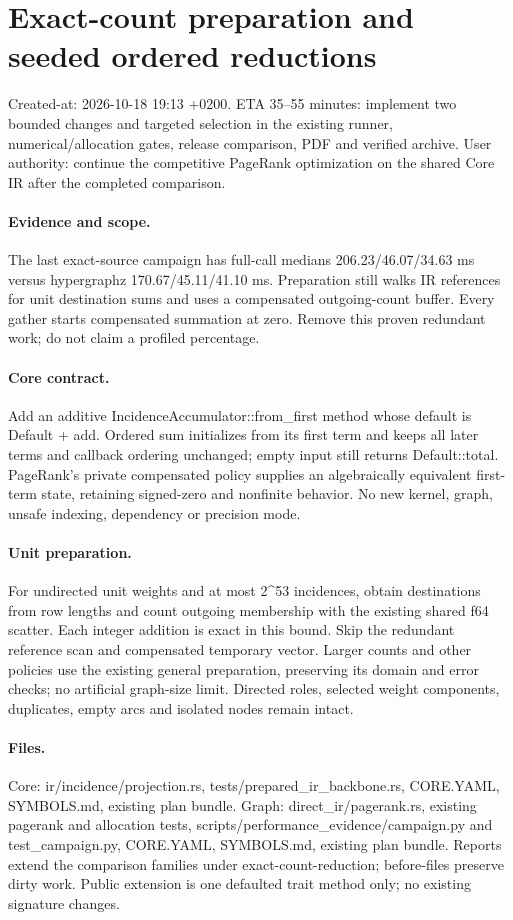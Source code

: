 \documentclass[11pt,a4paper]{article}
\begin{document}
\newpage\section*{Exact-count preparation and seeded ordered reductions}
Created-at: 2026-10-18 19:13 +0200. ETA 35--55 minutes: implement two bounded changes and targeted
selection in the existing runner, numerical/allocation gates, release comparison,
PDF and verified archive. User authority: continue the competitive PageRank
optimization on the shared Core IR after the completed comparison.
\paragraph{Evidence and scope.} The last exact-source campaign has full-call
medians 206.23/46.07/34.63 ms versus hypergraphz 170.67/45.11/41.10 ms.
Preparation still walks IR references for unit destination sums and uses a
compensated outgoing-count buffer. Every gather starts compensated summation at
zero. Remove this proven redundant work; do not claim a profiled percentage.
\paragraph{Core contract.} Add an additive IncidenceAccumulator::from\_first
method whose default is Default + add. Ordered sum initializes from its first
term and keeps all later terms and callback ordering unchanged; empty input
still returns Default::total. PageRank's private compensated policy supplies an
algebraically equivalent first-term state, retaining signed-zero and nonfinite
behavior. No new kernel, graph, unsafe indexing, dependency or precision mode.
\paragraph{Unit preparation.} For undirected unit weights and at most 2\^{}53
incidences, obtain destinations from row lengths and count outgoing membership
with the existing shared f64 scatter. Each integer addition is exact in this
bound. Skip the redundant reference scan and compensated temporary vector.
Larger counts and other policies use the existing general preparation, preserving
its domain and error checks; no artificial graph-size limit. Directed roles,
selected weight components, duplicates, empty arcs and isolated nodes remain intact.
\paragraph{Files.} Core: ir/incidence/projection.rs, tests/prepared\_ir\_backbone.rs,
CORE.YAML, SYMBOLS.md, existing plan bundle. Graph: direct\_ir/pagerank.rs,
existing pagerank and allocation tests, scripts/performance\_evidence/campaign.py
and test\_campaign.py, CORE.YAML, SYMBOLS.md, existing plan bundle. Reports extend
the comparison families under exact-count-reduction; before-files preserve dirty
work. Public extension is one defaulted trait method only; no existing signature changes.
\end{document}
